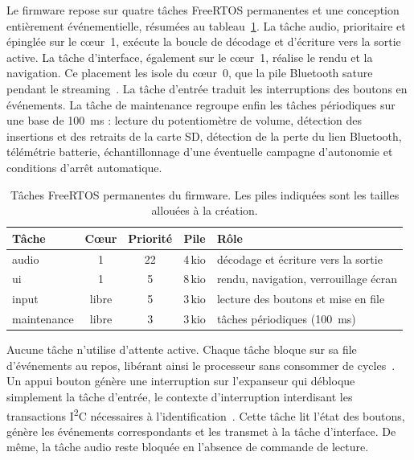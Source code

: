 Le firmware repose sur quatre tâches FreeRTOS permanentes et une conception entièrement événementielle, résumées au tableau~\ref{tab:taches}. La tâche audio, prioritaire et épinglée sur le cœur~1, exécute la boucle de décodage et d'écriture vers la sortie active. La tâche d'interface, également sur le cœur~1, réalise le rendu et la navigation. Ce placement les isole du cœur~0, que la pile Bluetooth sature pendant le streaming~\cite{ESP32_IDF_guide}. La tâche d'entrée traduit les interruptions des boutons en événements. La tâche de maintenance regroupe enfin les tâches périodiques sur une base de 100~ms : lecture du potentiomètre de volume, détection des insertions et des retraits de la carte SD, détection de la perte du lien Bluetooth, télémétrie batterie, échantillonnage d'une éventuelle campagne d'autonomie et conditions d'arrêt automatique.

\begin{table}[H]
    \centering
    \caption{Tâches FreeRTOS permanentes du firmware. Les piles indiquées sont les tailles allouées à la création.}
    \label{tab:taches}
    \footnotesize
    \begin{tabular}{lcccl}
        \toprule
        Tâche       & Cœur  & Priorité & Pile   & Rôle                                  \\
        \midrule
        audio       & 1     & 22       & 4\,kio & décodage et écriture vers la sortie   \\
        ui          & 1     & 5        & 8\,kio & rendu, navigation, verrouillage écran \\
        input       & libre & 5        & 3\,kio & lecture des boutons et mise en file   \\
        maintenance & libre & 3        & 3\,kio & tâches périodiques (100~ms)           \\
        \bottomrule
    \end{tabular}
\end{table}

Aucune tâche n'utilise d'attente active. Chaque tâche bloque sur sa file d'événements au repos, libérant ainsi le processeur sans consommer de cycles~\cite{barry_mastering_freertos}. Un appui bouton génère une interruption sur l'expanseur qui débloque simplement la tâche d'entrée, le contexte d'interruption interdisant les transactions I\textsuperscript{2}C nécessaires à l'identification~\cite{diodes_inc_PI4IOE5V9554}. Cette tâche lit l'état des boutons, génère les événements correspondants et les transmet à la tâche d'interface. De même, la tâche audio reste bloquée en l'absence de commande de lecture.

